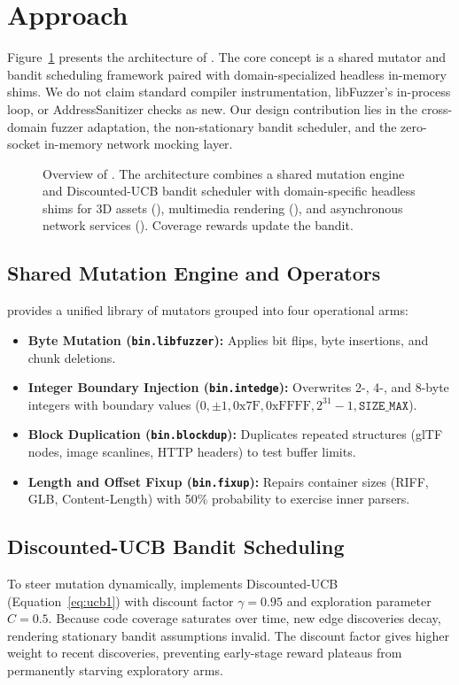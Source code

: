 \section{Approach}
\label{sec:approach}

Figure~\ref{fig:overview} presents the architecture of \tool.
The core concept is a shared mutator and bandit scheduling framework paired with domain-specialized headless in-memory shims.
We do not claim standard compiler instrumentation, libFuzzer's in-process loop, or AddressSanitizer checks as new.
Our design contribution lies in the cross-domain fuzzer adaptation, the non-stationary bandit scheduler, and the zero-socket in-memory network mocking layer.

\begin{figure}[t]
  \centering
  
  \caption{Overview of \tool. The architecture combines a shared mutation engine and Discounted-UCB bandit scheduler with domain-specific headless shims for 3D assets (), multimedia rendering (), and asynchronous network services (). Coverage rewards update the bandit.}
  \label{fig:overview}
\end{figure}

\subsection{Shared Mutation Engine and Operators}
\label{sec:mutation_engine}
\tool provides a unified library of mutators grouped into four operational arms:
\begin{itemize}
  \item \textbf{Byte Mutation (\texttt{bin.libfuzzer}):} Applies bit flips, byte insertions, and chunk deletions.
  \item \textbf{Integer Boundary Injection (\texttt{bin.intedge}):} Overwrites 2-, 4-, and 8-byte integers with boundary values ($0, \pm 1, 0\text{x7F}, 0\text{xFFFF}, 2^{31}-1, \texttt{SIZE\_MAX}$).
  \item \textbf{Block Duplication (\texttt{bin.blockdup}):} Duplicates repeated structures (glTF nodes, image scanlines, HTTP headers) to test buffer limits.
  \item \textbf{Length and Offset Fixup (\texttt{bin.fixup}):} Repairs container sizes (RIFF, GLB, Content-Length) with 50\% probability to exercise inner parsers.
\end{itemize}

\subsection{Discounted-UCB Bandit Scheduling}
\label{sec:bandit_scheduler}
To steer mutation dynamically, \tool implements Discounted-UCB (Equation~\ref{eq:ucb1}) with discount factor $\gamma = 0.95$ and exploration parameter $C = 0.5$.
Because code coverage saturates over time, new edge discoveries decay, rendering stationary bandit assumptions invalid.
The discount factor gives higher weight to recent discoveries, preventing early-stage reward plateaus from permanently starving exploratory arms.

